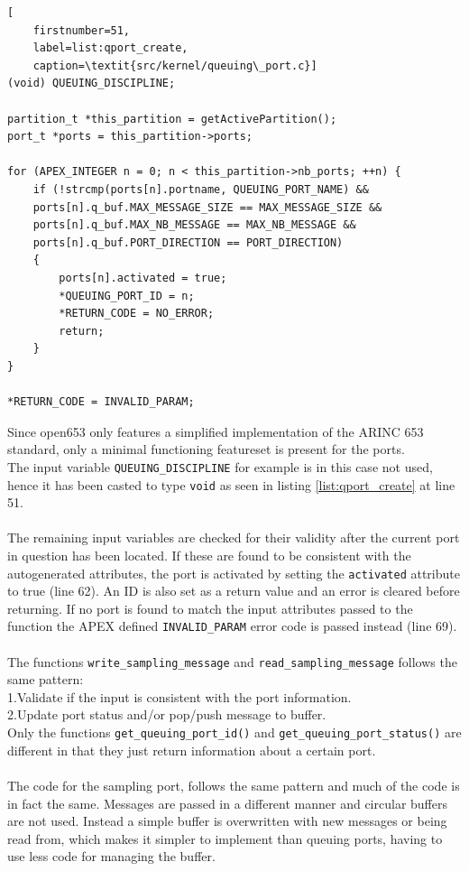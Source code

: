 \begin{minipage}{\linewidth}
\begin{lstlisting}[
	firstnumber=51,
	label=list:qport_create,
	caption=\textit{src/kernel/queuing\_port.c}]
(void) QUEUING_DISCIPLINE;

partition_t *this_partition = getActivePartition();
port_t *ports = this_partition->ports;

for (APEX_INTEGER n = 0; n < this_partition->nb_ports; ++n) {
    if (!strcmp(ports[n].portname, QUEUING_PORT_NAME) &&
    ports[n].q_buf.MAX_MESSAGE_SIZE == MAX_MESSAGE_SIZE &&
    ports[n].q_buf.MAX_NB_MESSAGE == MAX_NB_MESSAGE &&
    ports[n].q_buf.PORT_DIRECTION == PORT_DIRECTION)
    {
        ports[n].activated = true;
        *QUEUING_PORT_ID = n;
        *RETURN_CODE = NO_ERROR;
        return;
    }
}

*RETURN_CODE = INVALID_PARAM;
\end{lstlisting}
\end{minipage}

Since open653 only features a simplified implementation of the ARINC 653 standard,
only a minimal functioning featureset is present for the ports.\\
The input variable \texttt{QUEUING\_DISCIPLINE} for example is in this case not used,
hence it has been casted to type \texttt{void} as seen in listing \ref{list:qport_create} at line 51.
\\\\
The remaining input variables are checked for their validity after the current port in question
has been located.
If these are found to be consistent with the autogenerated attributes, the port is activated by setting
the \texttt{activated} attribute to true (line 62).
An ID is also set as a return value and an error is cleared before returning.
If no port is found to match the input attributes passed to the function
the APEX defined \texttt{INVALID\_PARAM} error code is passed instead (line 69).
\\\\
The functions \texttt{write\_sampling\_message} and \texttt{read\_sampling\_message} follows the same pattern:\\
1.\quad Validate if the input is consistent with the port information.\\
2.\quad Update port status and/or pop/push message to buffer.\\

Only the functions \texttt{get\_queuing\_port\_id()} and \texttt{get\_queuing\_port\_status()}
are different in that they just return information about a certain port.
\\\\
The code for the sampling port, follows the same pattern and much of the code is in fact the same.
Messages are passed in a different manner and circular buffers are not used.
Instead a simple buffer is overwritten with new messages or being read from,
which makes it simpler to implement than queuing ports, having to use less code for managing the buffer.


